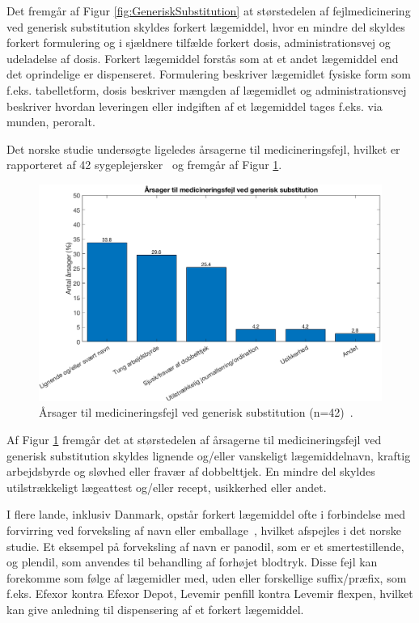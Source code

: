 Det fremgår af Figur \ref{fig:GeneriskSubstitution} at størstedelen af fejlmedicinering ved generisk substitution skyldes forkert lægemiddel, hvor en mindre del skyldes forkert formulering og i sjældnere tilfælde forkert dosis, administrationsvej og udeladelse af dosis. Forkert lægemiddel forstås som at et andet lægemiddel end det oprindelige er dispenseret. Formulering beskriver lægemidlet fysiske form som f.eks. tabelletform, dosis beskriver mængden af lægemidlet og administrationsvej beskriver hvordan leveringen eller indgiften af et lægemiddel tages f.eks. via munden, peroralt.

Det norske studie undersøgte ligeledes årsagerne til medicineringsfejl, hvilket er rapporteret af 42 sygeplejersker~\citep{Hakonsen2010} og fremgår af Figur \ref{fig:GeneriskSubstitution1}.

\begin{figure}[H]\centering	\includegraphics[width=1\textwidth]{billeder/GenSub1.png} 
	\caption{Årsager til medicineringsfejl ved generisk substitution (n=42)~\citep{Hakonsen2010}.}	\label{fig:GeneriskSubstitution1}  
\end{figure}

Af Figur \ref{fig:GeneriskSubstitution1} fremgår det at størstedelen af årsagerne til medicineringsfejl ved generisk substitution skyldes lignende og/eller vanskeligt lægemiddelnavn, kraftig arbejdsbyrde og sløvhed eller fravær af dobbelttjek. En mindre del skyldes utilstrækkeligt lægeattest og/eller recept, usikkerhed eller andet. 

I flere lande, inklusiv Danmark, opstår forkert lægemiddel ofte i forbindelse med forvirring ved  forveksling af navn eller emballage~\citep{DanskSelskabforPatientsikkerhed2009}, hvilket afspejles i det norske studie. Et eksempel på forveksling af navn er panodil, som er et smertestillende, og plendil, som anvendes til behandling af forhøjet blodtryk. Disse fejl kan forekomme som følge af lægemidler med, uden eller forskellige suffix/præfix, som f.eks. Efexor kontra Efexor Depot, Levemir penfill kontra Levemir flexpen, hvilket kan give anledning til dispensering af et forkert lægemiddel.~\citep{DanskSelskabforPatientsikkerhed2009}

